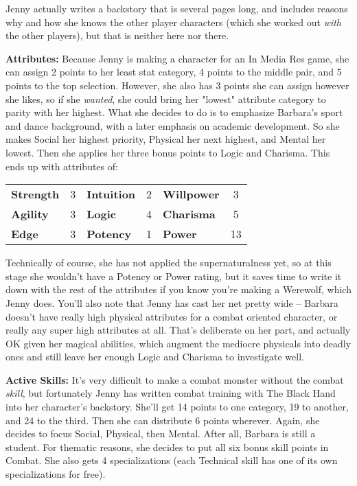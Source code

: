 Jenny actually writes a backstory that is several pages long, and includes reasons why and how she knows the other player characters (which she worked out \textit{with} the other players), but that is neither here nor there.

\textbf{Attributes:} Because Jenny is making a character for an In Media Res game, she can assign 2 points to her least stat category, 4 points to the middle pair, and 5 points to the top selection. However, she also has 3 points she can assign however she likes, so if she \textit{wanted}, she could bring her "lowest" attribute category to parity with her highest. What she decides to do is to emphasize Barbara's sport and dance background, with a later emphasis on academic development. So she makes Social her highest priority, Physical her next highest, and Mental her lowest. Then she applies her three bonus points to Logic and Charisma. This ends up with attributes of:

\medskip
\begin{tabular}{lc lc lc}
\textbf{Strength} & 3 & \textbf{Intuition} & 2 & \textbf{Willpower} & 3\\
\textbf{Agility} & 3 & \textbf{Logic} & 4 & \textbf{Charisma} & 5\\
\textbf{Edge} & 3 & \textbf{Potency} & 1 & \textbf{Power} & 13\\
\end{tabular}
\medskip

Technically of course, she has not applied the supernaturalness yet, so at this stage she wouldn't have a Potency or Power rating, but it saves time to write it down with the rest of the attributes if you know you're making a Werewolf, which Jenny does. You'll also note that Jenny has cast her net pretty wide -- Barbara doesn't have really high physical attributes for a combat oriented character, or really any super high attributes at all. That's deliberate on her part, and actually OK given her magical abilities, which augment the mediocre physicals into deadly ones and still leave her enough Logic and Charisma to investigate well.

\textbf{Active Skills:} It's very difficult to make a combat monster without the combat \textit{skill}, but fortunately Jenny has written combat training with The Black Hand into her character's backstory. She'll get 14 points to one category, 19 to another, and 24 to the third. Then she can distribute 6 points wherever. Again, she decides to focus Social, Physical, then Mental. After all, Barbara is still a student. For thematic reasons, she decides to put all six bonus skill points in Combat. She also gets 4 specializations (each Technical skill has one of its own specializations for free).

